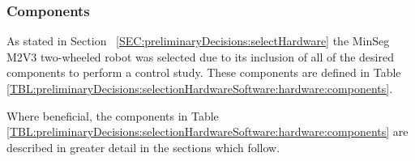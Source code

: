\documentclass[crop=false,float=true,class=scrreprt]{standalone}
\begin{document}
\subsubsection{Components}
\label{SEC:preliminaryDecisions:selectionHardwareSoftware:hardware:components}

As stated in Section~%
\ref{SEC:preliminaryDecisions:selectHardware}
the MinSeg M2V3 two-wheeled robot was selected 
due to its inclusion of all of the desired components to perform a control study.  
These components are defined in Table~%
\ref{TBL:preliminaryDecisions:selectionHardwareSoftware:hardware:components}.

Where beneficial, the components in Table~%
\ref{TBL:preliminaryDecisions:selectionHardwareSoftware:hardware:components}
are described in greater detail in the sections which follow.
\end{document}
